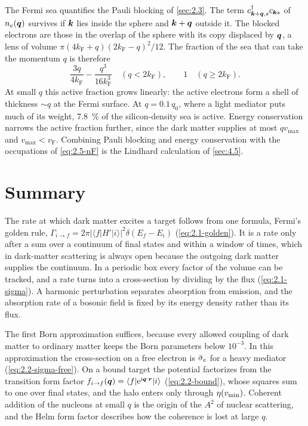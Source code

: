The Fermi sea quantifies the Pauli blocking of \cref{sec:2.3}. The term $c^\dagger_{\bm{k}+\bm{q},s}c_{\bm{k}s}$ of $n_e(\bm{q})$ survives if $\bm{k}$ lies inside the sphere and $\bm{k} + \bm{q}$ outside it. The blocked electrons are those in the overlap of the sphere with its copy displaced by $\bm{q}$, a lens of volume $\pi(4k_{\mathrm{F}} + q)(2k_{\mathrm{F}} - q)^2/12$. The fraction of the sea that can take the momentum $q$ is therefore
\begin{equation}
  \frac{3q}{4k_{\mathrm{F}}} - \frac{q^3}{16k_{\mathrm{F}}^3} \quad (q < 2k_{\mathrm{F}}), \qquad 1 \quad (q \ge 2k_{\mathrm{F}}) .
  \label{eq:2.5-blocking}
\end{equation}
At small $q$ this active fraction grows linearly: the active electrons form a shell of thickness $\sim q$ at the Fermi surface. At $q = 0.1\,q_0$, where a light mediator puts much of its weight, \SI{7.8}{\percent} of the silicon-density sea is active. Energy conservation narrows the active fraction further, since the dark matter supplies at most $qv_{\mathrm{max}}$ and $v_{\mathrm{max}} < v_{\mathrm{F}}$. Combining Pauli blocking and energy conservation with the occupations of \cref{eq:2.5-nF} is the Lindhard calculation of \cref{sec:4.5}.

\section*{Summary}

The rate at which dark matter excites a target follows from one formula, Fermi's golden rule, $\varGamma_{i\to f} = 2\pi|\langle f|H'|i\rangle|^2\delta(E_f - E_i)$ (\cref{eq:2.1-golden}). It is a rate only after a sum over a continuum of final states and within a window of times, which in dark-matter scattering is always open because the outgoing dark matter supplies the continuum. In a periodic box every factor of the volume can be tracked, and a rate turns into a cross-section by dividing by the flux (\cref{eq:2.1-sigma}). A harmonic perturbation separates absorption from emission, and the absorption rate of a bosonic field is fixed by its energy density rather than its flux.

The first Born approximation suffices, because every allowed coupling of dark matter to ordinary matter keeps the Born parameters below $10^{-3}$. In this approximation the cross-section on a free electron is $\bar{\sigma}_{e}$ for a heavy mediator (\cref{eq:2.2-sigma-free}). On a bound target the potential factorizes from the transition form factor $f_{i\to f}(\bm{q}) = \langle f|\mathrm{e}^{\mathrm{i}\bm{q}\cdot\bm{r}}|i\rangle$ (\cref{eq:2.2-bound}), whose squares sum to one over final states, and the halo enters only through $\eta(v_{\mathrm{min}})$. Coherent addition of the nucleons at small $q$ is the origin of the $A^2$ of nuclear scattering, and the Helm form factor describes how the coherence is lost at large $q$.

